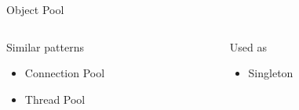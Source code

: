\documentclass{beamer}
\begin{document}
\begin{frame}{Object Pool}
\pause

\begin{columns}
  \begin{column}{.47\textwidth}
    \begin{block}{Similar patterns}
      \begin{itemize}
        \item Connection Pool
        \item Thread Pool
      \end{itemize}
    \end{block}
  \end{column}

  \begin{column}{.47\textwidth}
    \begin{block}{Used as}
      \begin{itemize}
        \item Singleton
      \end{itemize}
    \end{block}
  \end{column}
\end{columns}

\end{frame}
\end{document}

